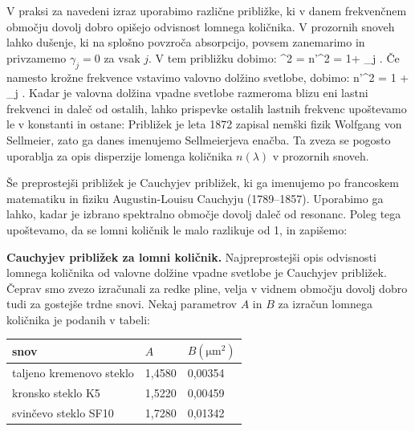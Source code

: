 V praksi za navedeni izraz uporabimo različne približke, ki v danem frekvenčnem
območju dovolj dobro opišejo odvisnost lomnega količnika. V prozornih snoveh lahko 
dušenje, ki na splošno povzroča absorpcijo, povsem zanemarimo in privzamemo $\gamma_j = 0$ za 
vsak $j$. V tem približku dobimo:
\beq
{}^2 = n'^2 = 1+ \sum_j .
\label{eq:09_28}
\eeq
Če namesto krožne frekvence vstavimo valovno dolžino svetlobe, dobimo:
\beq
n'^2 = 1 + \sum_j .
\label{eq:09_29}
\eeq
Kadar je valovna dolžina vpadne svetlobe razmeroma blizu eni lastni frekvenci in daleč
od ostalih, lahko prispevke ostalih lastnih frekvenc upoštevamo le v konstanti in ostane:
Približek je leta 1872 zapisal nemški fizik Wolfgang von Sellmeier, zato ga danes
imenujemo Sellmeierjeva enačba. Ta zveza se pogosto uporablja za opis disperzije 
lomenga količnika $n(\lambda)$ v prozornih snoveh. 

Še preprostejši približek je Cauchyjev približek, ki ga imenujemo po francoskem matematiku
in fiziku Augustin-Louisu Cauchyju (1789--1857). Uporabimo ga lahko, kadar je izbrano spektralno
območje dovolj daleč od resonanc. Poleg tega upoštevamo, da se lomni količnik le malo 
razlikuje od 1, in zapišemo:

\begin{example}{\bf Cauchyjev približek za lomni količnik.}
Najpreprostejši opis odvisnosti lomnega količnika od valovne dolžine vpadne svetlobe
je Cauchyjev približek. Čeprav smo zvezo izračunali za redke pline, velja v vidnem
območju dovolj dobro tudi
za gostejše trdne snovi. Nekaj parametrov $A$ in $B$ za izračun lomnega količnika
je podanih v tabeli:
\begin{center}
\begin{tabular}{|l|l|l|}
\hline
snov& $A$ & $B (\si{\micro\metre}^2)$\\ \hline 
taljeno kremenovo steklo & 1,4580 & 0,00354\\ \hline
kronsko steklo K5 & 1,5220 & 0,00459\\ \hline
svinčevo steklo SF10 & 1,7280 & 0,01342\\ \hline
\end{tabular}
\end{center}
\end{example}

